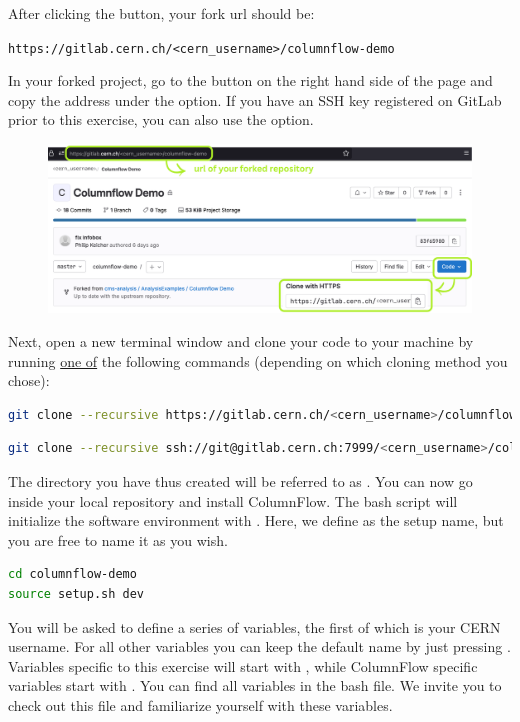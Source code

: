 After clicking the  button, your fork url should be:

\texttt{https://gitlab.cern.ch/<cern\_username>/columnflow-demo}

\newpage
In your forked project, go to the  button on the right hand side of the page and copy the address under the  option. If you have an SSH key registered on GitLab prior to this exercise, you can also use the  option. 

\begin{figure}[!h]
    \centering
    \includegraphics[scale=0.62]{images/fork2.png}
\end{figure}

Next, open a new terminal window and clone your code to your machine by running \underline{one of} the following commands (depending on which cloning method you chose):

\begin{lstlisting}[language=bash]
git clone --recursive https://gitlab.cern.ch/<cern_username>/columnflow-demo.git
\end{lstlisting}
\begin{lstlisting}[language=bash]
git clone --recursive ssh://git@gitlab.cern.ch:7999/<cern_username>/columnflow-demo.git
\end{lstlisting}

The directory you have thus created will be referred to as . You can now go inside your local repository and install ColumnFlow. The  bash script will initialize the software environment with . Here, we define  as the setup name, but you are free to name it as you wish.

\begin{lstlisting}[language=bash]
cd columnflow-demo
source setup.sh dev
\end{lstlisting}

You will be asked to define a series of variables, the first of which is your CERN username. For all other variables you can keep the default name by just pressing . Variables specific to this exercise will start with , while ColumnFlow specific variables start with . You can find all variables in the  bash file. We invite you to check out this file and familiarize yourself with these variables.

